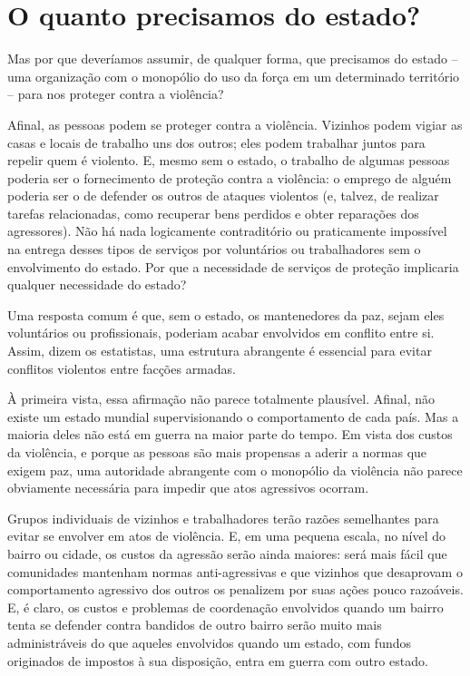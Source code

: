 \section{O quanto precisamos do estado?}

Mas por que deveríamos assumir, de qualquer forma, que precisamos do estado -- uma organização com o monopólio do uso da força em um determinado território -- para nos proteger contra a violência? 

Afinal, as pessoas podem se proteger contra a violência. Vizinhos podem vigiar as casas e locais de trabalho uns dos outros; eles podem trabalhar juntos para repelir quem é violento. E, mesmo sem o estado, o trabalho de algumas pessoas poderia ser o fornecimento de proteção contra a violência: o emprego de alguém poderia ser o de defender os outros de ataques violentos (e, talvez, de realizar tarefas relacionadas, como recuperar bens perdidos e obter reparações dos agressores). Não há nada logicamente contraditório ou praticamente impossível na entrega desses tipos de serviços por voluntários ou trabalhadores sem o envolvimento do estado. Por que a necessidade de serviços de proteção implicaria qualquer necessidade do estado?

Uma resposta comum é que, sem o estado, os mantenedores da paz, sejam eles voluntários ou profissionais, poderiam acabar envolvidos em conflito entre si. Assim, dizem os estatistas, uma estrutura abrangente é essencial para evitar conflitos violentos entre facções armadas.

À primeira vista, essa afirmação não parece totalmente plausível. Afinal, não existe um estado mundial supervisionando o comportamento de cada país. Mas a maioria deles não está em guerra na maior parte do tempo. Em vista dos custos da violência, e porque as pessoas são mais propensas a aderir a normas que exigem paz, uma autoridade abrangente com o monopólio da violência não parece obviamente necessária para impedir que atos agressivos ocorram.

Grupos individuais de vizinhos e trabalhadores terão razões semelhantes para evitar se envolver em atos de violência. E, em uma pequena escala, no nível do bairro ou cidade, os custos da agressão serão ainda maiores: será mais fácil que comunidades mantenham normas anti-agressivas e que vizinhos que desaprovam o comportamento agressivo dos outros os penalizem por suas ações pouco razoáveis. E, é claro, os custos e problemas de coordenação envolvidos quando um bairro tenta se defender contra bandidos de outro bairro serão muito mais administráveis do que aqueles envolvidos quando um estado, com fundos originados de impostos à sua disposição, entra em guerra com outro estado.

